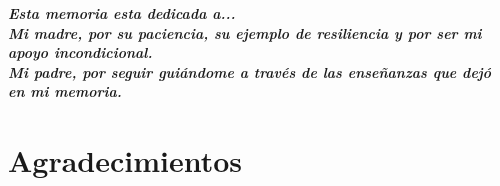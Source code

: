 \clearpage
\thispagestyle{empty}

\vspace*{\fill}
\begin{center}
\textbf{\textit{%
Esta memoria esta dedicada a...\\
Mi madre, por su paciencia, su ejemplo de resiliencia y por ser mi apoyo incondicional. \\
Mi padre, por seguir guiándome a través de las enseñanzas que dejó en mi memoria.
}}
\end{center}
\vspace*{\fill}

\clearpage
\section*{Agradecimientos}


